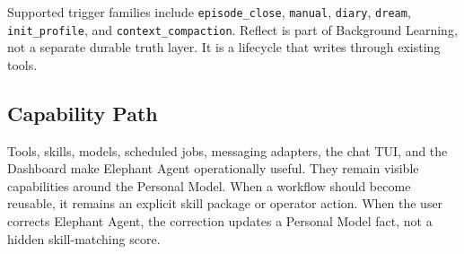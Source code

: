 Supported trigger families include \texttt{episode\_close}, \texttt{manual},
\texttt{diary}, \texttt{dream}, \texttt{init\_profile}, and
\texttt{context\_compaction}. Reflect is part of Background Learning, not a
separate durable truth layer. It is a lifecycle that writes through existing
tools.

\subsection{Capability Path}

Tools, skills, models, scheduled jobs, messaging adapters, the chat TUI, and the
Dashboard make Elephant Agent operationally useful. They remain visible capabilities
around the Personal Model. When a workflow should become reusable, it remains
an explicit skill package or operator action. When the user corrects Elephant Agent, the
correction updates a Personal Model fact, not a hidden skill-matching score.
